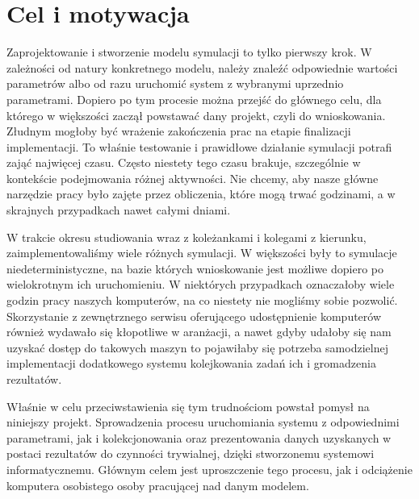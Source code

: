 \chapter{Cel i motywacja}
\label{cha:celIMotywacja}

\par Zaprojektowanie i stworzenie modelu symulacji to tylko pierwszy krok. W zależności od natury konkretnego modelu, należy znaleźć odpowiednie wartości parametrów albo od razu uruchomić system z wybranymi uprzednio parametrami. Dopiero po tym procesie można przejść do głównego celu, dla którego w większości zaczął powstawać dany projekt, czyli do wnioskowania. Złudnym mogłoby być wrażenie zakończenia prac na etapie finalizacji implementacji. To właśnie testowanie i prawidłowe działanie symulacji potrafi zająć najwięcej czasu. Często niestety tego czasu brakuje, szczególnie w kontekście podejmowania różnej aktywności. Nie chcemy, aby nasze główne narzędzie pracy było zajęte przez obliczenia, które mogą trwać godzinami, a w skrajnych przypadkach nawet całymi dniami.

\par W trakcie okresu studiowania wraz z koleżankami i kolegami z kierunku, zaimplementowaliśmy wiele różnych symulacji. W większości były to symulacje niedeterministyczne, na bazie których wnioskowanie jest możliwe dopiero po wielokrotnym ich uruchomieniu. W niektórych przypadkach oznaczałoby wiele godzin pracy naszych komputerów, na co niestety nie mogliśmy sobie pozwolić. Skorzystanie z zewnętrznego serwisu oferującego udostępnienie komputerów również wydawało się kłopotliwe w aranżacji, a nawet gdyby udałoby się nam uzyskać dostęp do takowych maszyn to pojawiłaby się potrzeba samodzielnej implementacji dodatkowego systemu kolejkowania zadań ich i gromadzenia rezultatów.

\par Właśnie w celu przeciwstawienia się tym trudnościom powstał pomysł na niniejszy projekt. Sprowadzenia procesu uruchomiania systemu z odpowiednimi parametrami, jak i kolekcjonowania oraz prezentowania danych uzyskanych w postaci rezultatów do czynności trywialnej, dzięki stworzonemu systemowi informatycznemu. Głównym celem jest uproszczenie tego procesu, jak i odciążenie komputera osobistego osoby pracującej nad danym modelem.